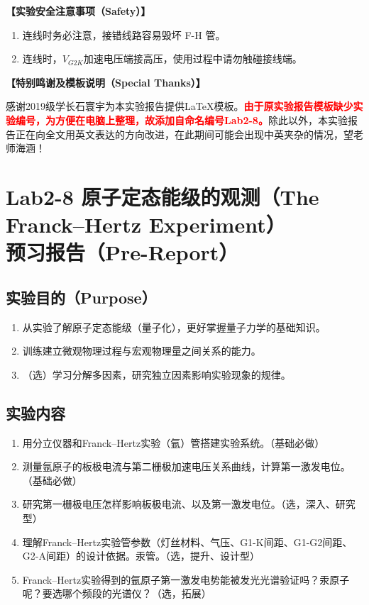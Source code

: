 \documentclass[dvipsnames, svgnames,a4paper,11pt]{article}
\begin{document}
	\textbf{【实验安全注意事项（Safety）】}	
	\begin{enumerate}
		\item 连线时务必注意，接错线路容易毁坏 F-H 管。
		\item 连线时，$V_{G2K}$加速电压端接高压，使用过程中请勿触碰接线端。
	\end{enumerate}
	
	
	\textbf{【特别鸣谢及模板说明（Special Thanks）】}	
	
	感谢2019级学长石寰宇为本实验报告提供\LaTeX 模板。\textcolor{red}{\textbf{由于原实验报告模板缺少实验编号，为方便在电脑上整理，故添加自命名编号Lab2-8。}}除此以外，本实验报告正在向全文用英文表达的方向改进，在此期间可能会出现中英夹杂的情况，望老师海涵！
	
	
	
	\clearpage
	\tableofcontents
	\clearpage
	
	
	
	
	\setcounter{section}{0}
	\section{Lab2-8 原子定态能级的观测（The Franck–Hertz Experiment）\\ \quad\heiti 预习报告（Pre-Report）}
	
	\subsection{实验目的（Purpose）}
	\begin{enumerate}
		\item 从实验了解原子定态能级（量子化），更好掌握量子力学的基础知识。
		\item 训练建立微观物理过程与宏观物理量之间关系的能力。
		\item （选）学习分解多因素，研究独立因素影响实验现象的规律。
		
	\end{enumerate}
	
	\subsection{实验内容}
	\begin{enumerate}
		\item 用分立仪器和Franck–Hertz实验（氩）管搭建实验系统。（基础必做）
		\item 测量氩原子的板极电流与第二栅极加速电压关系曲线，计算第一激发电位。（基础必做）
		\item 研究第一栅极电压怎样影响板极电流、以及第一激发电位。（选，深入、研究型）
		\item 理解Franck–Hertz实验管参数（灯丝材料、气压、G1-K间距、G1-G2间距、G2-A间距）的设计依据。汞管。（选，提升、设计型）
		\item Franck–Hertz实验得到的氩原子第一激发电势能被发光光谱验证吗？汞原子呢？要选哪个频段的光谱仪？（选，拓展）		
	\end{enumerate}
	
\end{document}
